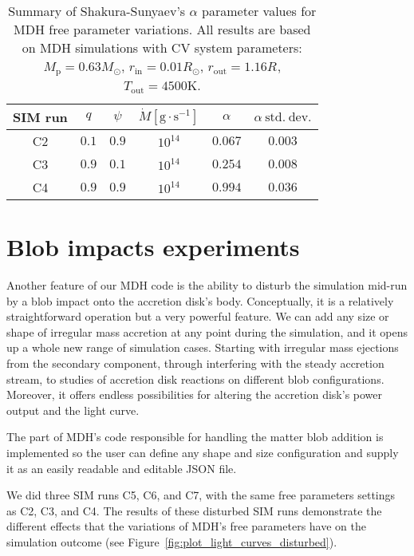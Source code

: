    \begin{table}[ht]
    \centering
    \begin{tabular*}{\columnwidth}{@{\extracolsep{\fill}}cccccc}
        SIM run & $q$ & $\psi$ & $\dot{M} [\si{\gram \cdot \second^{-1}}]$ & $\alpha$ & $\alpha\ \mathrm{std.\ dev.}$ \\ 
    \hline\hline
        C2 & $0.1$ & $0.9$ & $10^{14}$ & $0.067$ & $0.003$ \\
        C3 & $0.9$ & $0.1$ & $10^{14}$ & $0.254$ & $0.008$ \\
        C4 & $0.9$ & $0.9$ & $10^{14}$ & $0.994$ & $0.036$ \\
    \hline
    \end{tabular*}
        \caption{Summary of Shakura-Sunyaev's $\alpha$ parameter values for MDH free parameter variations. All results are based on MDH simulations with CV system parameters: $M_{\mathrm{p}} = 0.63 M_{\odot}$, $r_{\mathrm{in}} = 0.01 R_{\odot}$, $r_{\mathrm{out}} = 1.16 R_{}$, $T_{\mathrm{out}} = 4500 \si{\kelvin}$.}
    \label{tab:table_alpha_summary}
    \end{table}

\section{Blob impacts experiments}
    Another feature of our MDH code is the ability to disturb the simulation mid-run by a blob impact onto the accretion disk's body. Conceptually, it is a relatively straightforward operation but a very powerful feature. We can add any size or shape of irregular mass accretion at any point during the simulation, and it opens up a whole new range of simulation cases. Starting with irregular mass ejections from the secondary component, through interfering with the steady accretion stream, to studies of accretion disk reactions on different blob configurations. Moreover, it offers endless possibilities for altering the accretion disk's power output and the light curve. 

    The part of MDH's code responsible for handling the matter blob addition is implemented so the user can define any shape and size configuration and supply it as an easily readable and editable JSON file.

    We did three SIM runs C5, C6, and C7, with the same free parameters settings as C2, C3, and C4. The results of these disturbed SIM runs demonstrate the different effects that the variations of MDH's free parameters have on the simulation outcome (see Figure~\ref{fig:plot_light_curves_disturbed}).


